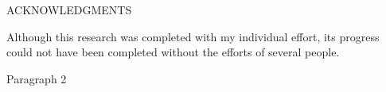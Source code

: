 
\setcounter{page}{3} %

\begin{center}
	ACKNOWLEDGMENTS
\end{center}

\indent Although this research was completed with my individual effort, its progress could not have been completed without the efforts of several people.

\indent Paragraph 2
